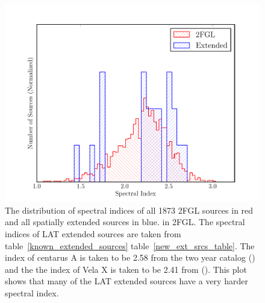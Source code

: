 \documentclass[12pt,preprint]{aastex}
\begin{document}
\clearpage
\begin{figure}
  \begin{center}
    \includegraphics{summary_plots/compare_index_2FGL.pdf}
    \end{center}
    \caption{
    The distribution of spectral indices of all 1873 2FGL sources in
    red and all spatially extended sources in blue.  in 2FGL. The
    spectral indices of LAT extended sources are taken from
    table~\ref{known_extended_sources} table~\ref{new_ext_srcs_table}.
    The index of centarus A is taken to be 2.58 from the two year catalog
    (\cite{second_cat}) and the the index of Vela X is taken to be 2.41
    from (\cite{velax}). This plot shows that many of the LAT
    extended sources have a very harder spectral index.
    }\label{compare_index_2FGL}
  \end{figure}
\end{document}
